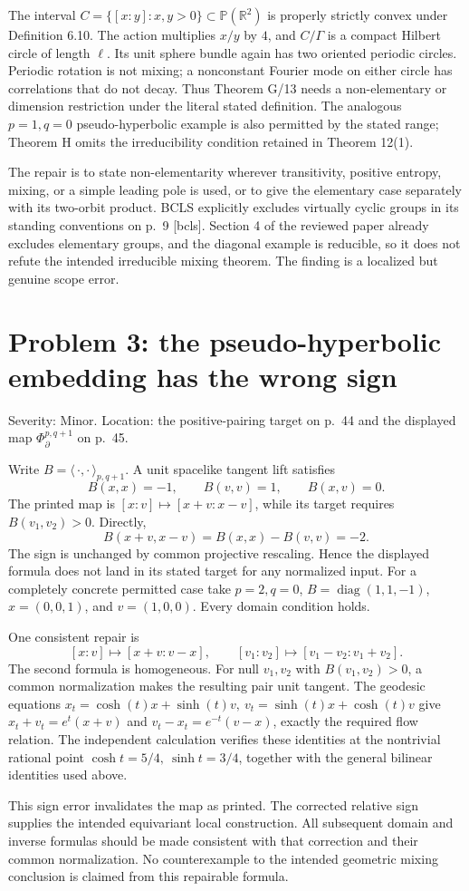 \documentclass[10pt]{article}
\begin{document}
The interval \(C=\{[x:y]:x,y>0\}\subset\mathbb P(\mathbb R^2)\) is properly strictly convex under Definition 6.10. The action multiplies \(x/y\) by \(4\), and \(C/\Gamma\) is a compact Hilbert circle of length \(\ell\). Its unit sphere bundle again has two oriented periodic circles. Periodic rotation is not mixing; a nonconstant Fourier mode on either circle has correlations that do not decay. Thus Theorem G/13 needs a non-elementary or dimension restriction under the literal stated definition. The analogous \(p=1,q=0\) pseudo-hyperbolic example is also permitted by the stated range; Theorem H omits the irreducibility condition retained in Theorem 12(1).\par
The repair is to state non-elementarity wherever transitivity, positive entropy, mixing, or a simple leading pole is used, or to give the elementary case separately with its two-orbit product. BCLS explicitly excludes virtually cyclic groups in its standing conventions on p. 9 [bcls]. Section 4 of the reviewed paper already excludes elementary groups, and the diagonal example is reducible, so it does not refute the intended irreducible mixing theorem. The finding is a localized but genuine scope error.\par
\section*{Problem 3: the pseudo-hyperbolic embedding has the wrong sign}
Severity: Minor. Location: the positive-pairing target on p. 44 and the displayed map \(\Phi_\partial^{p,q+1}\) on p. 45.\par
Write \(B=\langle\,\cdot,\cdot\,\rangle_{p,q+1}\). A unit spacelike tangent lift satisfies \[B(x,x)=-1,\qquad B(v,v)=1,\qquad B(x,v)=0.\] The printed map is \([x:v]\mapsto[x+v:x-v]\), while its target requires \(B(v_1,v_2)>0\). Directly, \[B(x+v,x-v)=B(x,x)-B(v,v)=-2.\] The sign is unchanged by common projective rescaling. Hence the displayed formula does not land in its stated target for any normalized input. For a completely concrete permitted case take \(p=2,q=0\), \(B=\operatorname{diag}(1,1,-1)\), \(x=(0,0,1)\), and \(v=(1,0,0)\). Every domain condition holds.\par
One consistent repair is \[[x:v]\longmapsto[x+v:v-x],\qquad
 [v_1:v_2]\longmapsto[v_1-v_2:v_1+v_2].\] The second formula is homogeneous. For null \(v_1,v_2\) with \(B(v_1,v_2)>0\), a common normalization makes the resulting pair unit tangent. The geodesic equations \(x_t=\cosh(t)x+\sinh(t)v,\ 
v_t=\sinh(t)x+\cosh(t)v\) give \(x_t+v_t=e^t(x+v)\) and \(v_t-x_t=e^{-t}(v-x)\), exactly the required flow relation. The independent calculation verifies these identities at the nontrivial rational point \(\cosh t=5/4,\ \sinh t=3/4\), together with the general bilinear identities used above.\par
This sign error invalidates the map as printed. The corrected relative sign supplies the intended equivariant local construction. All subsequent domain and inverse formulas should be made consistent with that correction and their common normalization. No counterexample to the intended geometric mixing conclusion is claimed from this repairable formula.\par
\end{document}
